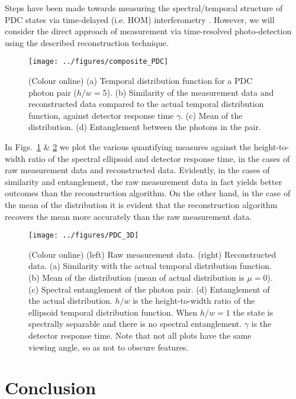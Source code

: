 \documentclass[aps,pra,twocolumn,amsmath,amssymb,color,superscriptaddress]{revtex4}
\begin{document}
Steps have been made towards measuring the spectral/temporal structure of PDC states via time-delayed (i.e. HOM) interferometry \cite{bib:YoonHo03}. However, we will consider the direct approach of measurement via time-resolved photo-detection using the described reconstruction technique.

\begin{figure}[!htb]
\texttt{[image: ../figures/composite\_PDC]}
\caption{(Colour online) (a) Temporal distribution function for a PDC photon pair (\mbox{$h/w=5$}). (b) Similarity of the measurement data and reconstructed data compared to the actual temporal distribution function, against detector response time $\gamma$. (c) Mean of the distribution. (d) Entanglement between the photons in the pair.} \label{fig:composite_PDC}
\end{figure}

In Figs.~\ref{fig:composite_PDC} \& \ref{fig:composite_PDC_3D} we plot the various quantifying measures against the height-to-width ratio of the spectral ellipsoid and detector response time, in the cases of raw measurement data and reconstructed data. Evidently, in the cases of similarity and entanglement, the raw measurement data in fact yields better outcomes than the reconstruction algorithm. On the other hand, in the case of the mean of the distribution it is evident that the reconstruction algorithm recovers the mean more accurately than the raw measurement data.

\begin{figure}[!htb]
\texttt{[image: ../figures/PDC\_3D]}
\caption{(Colour online) (left) Raw measurement data. (right) Reconstructed data. (a) Similarity with the actual temporal distribution function. (b) Mean of the distribution (mean of actual distribution is \mbox{$\mu=0$}). (c) Spectral entanglement of the photon pair. (d) Entanglement of the actual distribution. \mbox{$h/w$} is the height-to-width ratio of the ellipsoid temporal distribution function. When \mbox{$h/w=1$} the state is spectrally separable and there is no spectral entanglement. $\gamma$ is the detector response time. Note that not all plots have the same viewing angle, so as not to obscure features.} \label{fig:composite_PDC_3D}
\end{figure}

%
%

\section{Conclusion}
\end{document}
